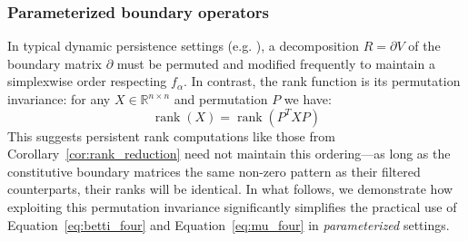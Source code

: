 \documentclass[pdflatex,sn-mathphys-num]{sn-jnl}
\begin{document}
\subsubsection{Parameterized boundary operators}\label{sec:param_boundary}

In typical dynamic persistence settings (e.g. \cite{cohen2006vines}), a decomposition \(R = \partial V\) of the boundary matrix \(\partial\) must be permuted and modified frequently to maintain a simplexwise order respecting \(f_{\alpha}\). In contrast, the rank function is its permutation invariance: for any \(X \in \mathbb{R}^{n \times n}\) and permutation \(P\) we have: 
\[\operatorname{rank}(X) = \operatorname{rank} \left( P^{T}XP \right) \] 
This suggests persistent rank computations like those from Corollary~\ref{cor:rank_reduction} need not maintain this ordering---as long as the constitutive boundary matrices the same non-zero pattern as their filtered counterparts, their ranks will be identical. In what follows, we demonstrate how exploiting this permutation invariance significantly simplifies the practical use of Equation~\ref{eq:betti_four} and Equation~\ref{eq:mu_four} in \emph{parameterized} settings.
\end{document}
